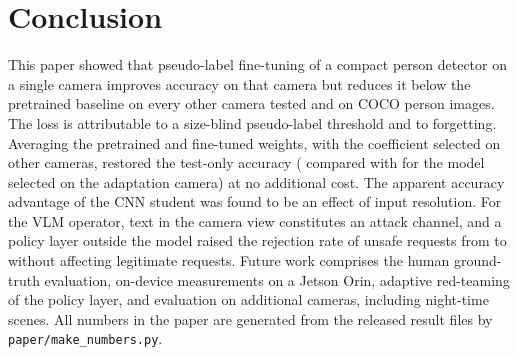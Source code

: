 \section{Conclusion}
\label{sec:conclusion}
This paper showed that pseudo-label fine-tuning of a compact person detector on a single camera improves accuracy on
that camera but reduces it below the pretrained baseline on every other camera tested and on COCO person images. The
loss is attributable to a size-blind pseudo-label threshold and to forgetting. Averaging the pretrained and fine-tuned
weights, with the coefficient selected on other cameras, restored the test-only accuracy (\MsSelHo{} compared with
\MsFtHo{} for the model selected on the adaptation camera) at no additional cost. The apparent accuracy advantage of
the CNN student was found to be an effect of input resolution. For the VLM operator, text in the camera view
constitutes an attack channel, and a policy layer outside the model raised the rejection rate of unsafe requests from
\SfGrTestRej{} to \SfPoTestRej{} without affecting legitimate requests. Future work comprises the human ground-truth
evaluation, on-device measurements on a Jetson Orin, adaptive red-teaming of the policy layer, and evaluation on
additional cameras, including night-time scenes. All numbers in the paper are generated from the released result
files by \texttt{paper/make\_numbers.py}.
